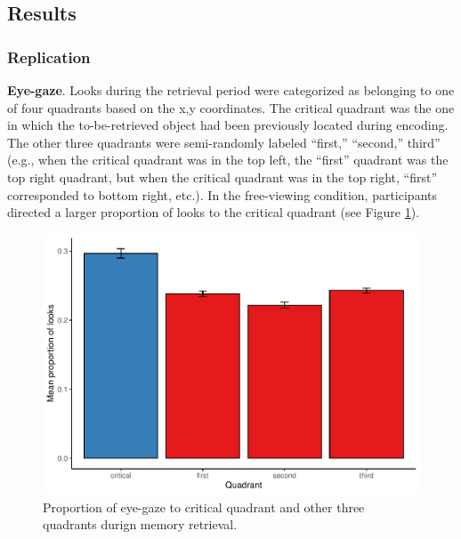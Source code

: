 \documentclass[
  english,
  man,floatsintext]{apa6}
\begin{document}
\hypertarget{results-1}{%
\subsection{Results}\label{results-1}}

\hypertarget{replication-1}{%
\subsubsection{Replication}\label{replication-1}}

\textbf{Eye-gaze}. Looks during the retrieval period were categorized as belonging to one of four quadrants based on the x,y coordinates. The critical quadrant was the one in which the to-be-retrieved object had been previously located during encoding. The other three quadrants were semi-randomly labeled ``first,'' ``second,'' third'' (e.g., when the critical quadrant was in the top left, the ``first'' quadrant was the top right quadrant, but when the critical quadrant was in the top right, ``first'' corresponded to bottom right, etc.). In the free-viewing condition, participants directed a larger proportion of looks to the critical quadrant (see Figure \ref{fig:E2-gaze-fig}).

\begin{figure}
\centering
\includegraphics{manuscript_files/figure-latex/E2-gaze-fig-1.pdf}
\caption{\label{fig:E2-gaze-fig}Proportion of eye-gaze to critical quadrant and other three quadrants durign memory retrieval.}
\end{figure}
\end{document}
